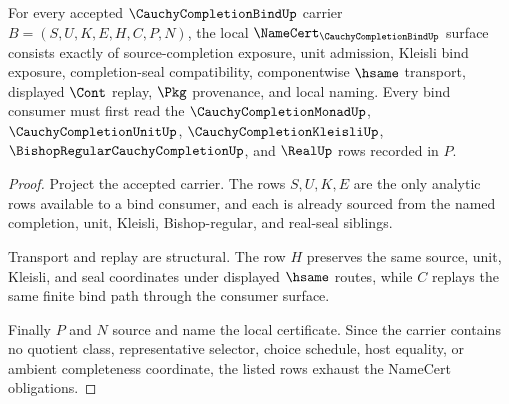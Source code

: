 \begin{theorem}
\label{thm:cauchy-completion-bind-namecert-obligations}
For every accepted $\CauchyCompletionBindUp$ carrier $B=(S,U,K,E,H,C,P,N)$, the local $\NameCert_{\CauchyCompletionBindUp}$ surface consists exactly of source-completion exposure, unit admission, Kleisli bind exposure, completion-seal compatibility, componentwise $\hsame$ transport, displayed $\Cont$ replay, $\Pkg$ provenance, and local naming. Every bind consumer must first read the $\CauchyCompletionMonadUp$, $\CauchyCompletionUnitUp$, $\CauchyCompletionKleisliUp$, $\BishopRegularCauchyCompletionUp$, and $\RealUp$ rows recorded in $P$.
\end{theorem}
\begin{proof}
Project the accepted carrier. The rows $S,U,K,E$ are the only analytic rows available to a bind consumer, and each is already sourced from the named completion, unit, Kleisli, Bishop-regular, and real-seal siblings.

Transport and replay are structural. The row $H$ preserves the same source, unit, Kleisli, and seal coordinates under displayed $\hsame$ routes, while $C$ replays the same finite bind path through the consumer surface.

Finally $P$ and $N$ source and name the local certificate. Since the carrier contains no quotient class, representative selector, choice schedule, host equality, or ambient completeness coordinate, the listed rows exhaust the NameCert obligations.
\end{proof}

